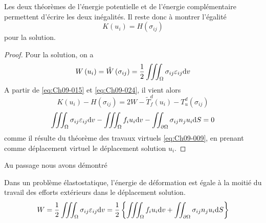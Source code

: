 Les deux théorèmes de l'énergie potentielle et de l'énergie complémentaire permettent d'écrire les deux inégalités.
Il reste donc à montrer l'égalité 
\begin{equation}
    K\left( u_i \right) = H\left( \sigma_{ij} \right)
    \label{eq:Ch09-030}
\end{equation}
pour la solution. 
\begin{proof}
    Pour la solution, on a 
    \begin{displaymath}
        W\left( u_i \right) = \hat{W} \left( \sigma_{ij} \right) = \frac{1}{2} \iiint_{\Omega} \sigma_{ij} \varepsilon_{ij} \mathrm{d} v
    \end{displaymath}
    A partir de \eqref{eq:Ch09-015} et \eqref{eq:Ch09-024}, il vient alors
    \begin{displaymath}
        K\left( u_i \right) - H \left( \sigma_{ij} \right) = 2W - \tilde{T}_f^d \left( u_i \right) - T_u^d \left( \sigma_{ij} \right)
    \end{displaymath}
    \begin{displaymath}
        \iiint_{\Omega} \sigma_{ij} \varepsilon_{ij} \mathrm{d} v - \iiint_{\Omega} f_i u_i \mathrm{d} v - \iint_{\partial \Omega} \sigma_{ij} n_j u_i \mathrm{d} S = 0
    \end{displaymath}
    comme il résulte du théorème des travaux virtuels \eqref{eq:Ch09-009}, en prenant comme déplacement virtuel le déplacement solution $u_i$.
\end{proof}

Au passage nous avons démontré
\begin{thm}
    Dans un problème élastostatique, l'énergie de déformation est égale à la moitié du travail des efforts extérieurs dans le déplacement solution.
    \begin{equation}
        W = \frac{1}{2} \iiint_{\Omega} \sigma_{ij} \varepsilon_{ij} \mathrm{d} v = \frac{1}{2} \left\{ \iiint_{\Omega} f_i u_i \mathrm{d} v + \iint_{\partial \Omega} \sigma_{ij} n_j u_i \mathrm{d} S \right\}
        \label{eq:Ch09-031}
    \end{equation}
\end{thm}


